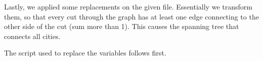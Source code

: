 \documentclass{base}
\begin{document}
Lastly, we applied some replacements on the given file. Essentially we transform them, so that every cut through the graph has at least one edge connecting to the other side of the cut (sum more than 1). This causes the spanning tree that connects all cities.

The script used to replace the variables follows first. 



\end{document}
